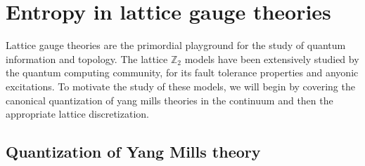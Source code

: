 \chapter{Entropy in lattice gauge theories}

Lattice gauge theories are the primordial playground for the study of quantum information and topology. 
The lattice $\mathbb{Z}_2$ models have been extensively studied by the quantum computing community,
for its fault tolerance properties and anyonic excitations. To motivate the study of these models,
 we will begin by covering the canonical quantization of yang mills theories in the continuum and 
 then the appropriate lattice discretization.

 \section{Quantization of Yang Mills theory}
 